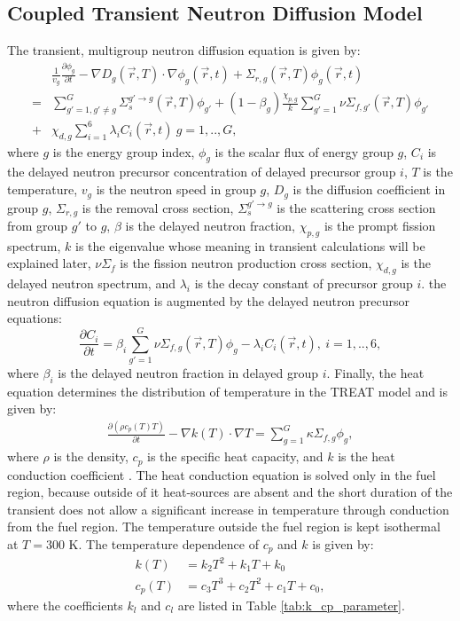 \documentclass{anstrans}
\begin{document}
\subsection{Coupled Transient Neutron Diffusion Model}
The transient, multigroup neutron diffusion equation is given by:
\begin{align}\label{eq:neutron_diffusion}
   &\frac{1}{v_g} \frac{\partial \phi_g}{\partial t} -\nabla D_g(\vec{r},T) \cdot \nabla \phi_g(\vec{r}, t) + \Sigma_{r,g}(\vec{r}, T) \phi_g(\vec{r}, t) \nonumber \\
   = &\sum\limits_{g'=1, g' \neq g}^G \Sigma_s^{g' \rightarrow g} (\vec{r},T) \phi_{g'}  
   +(1 - \beta_g) \frac{\chi_{p,g}}{k}\sum\limits_{g'=1}^G \nu \Sigma_{f,g'} (\vec{r},T) \phi_{g'} \nonumber \\
+& \chi_{d,g }\sum\limits_{i=1}^6  \lambda_i C_i(\vec{r}, t)~g=1,..,G,
\end{align}
where $g$ is the energy group index, $\phi_g$ is the scalar flux of energy group $g$, $C_i$ is the delayed neutron precursor concentration of delayed precursor group $i$, $T$ is the temperature, $v_g$ is the neutron speed in group $g$, $D_g$ is the diffusion coefficient in group $g$, $\Sigma_{r,g}$ is the removal cross section, $\Sigma_s^{g'\rightarrow g}$ is the scattering cross section from group $g'$ to $g$, $\beta$ is the delayed neutron fraction, $\chi_{p,g}$ is the prompt fission spectrum, $k$ is the eigenvalue whose meaning in transient calculations will be explained later, $\nu \Sigma_f$  is the fission neutron production cross section, $\chi_{d,g}$ is the delayed neutron spectrum, and $\lambda_i$ is the decay constant of precursor group $i$. the neutron diffusion equation  is augmented by the delayed neutron precursor equations:
\begin{equation}\label{eq:delayed_precursors}
   \frac{\partial C_i }{\partial t} = \beta_i \sum\limits_{g'=1}^G \nu \Sigma_{f,g} (\vec{r},T) \phi_{g} - \lambda_i C_i(\vec{r},t),~i=1,..,6,
\end{equation} 
where $\beta_i$ is the delayed neutron fraction in delayed group $i$. Finally, the heat equation determines the distribution of temperature in the TREAT model and is given by:
\begin{align}\label{eq:heat_conduction}
  \frac{\partial (\rho c_p(T)T)}{\partial t} - \nabla k(T) \cdot \nabla T =\sum\limits_{g=1}^G \kappa \Sigma_{f,g} \phi_g,
\end{align}
where $\rho$ is the density, $c_p$ is the specific heat capacity, and $k$ is the heat conduction coefficient . The heat conduction equation is solved only in the fuel region, because outside of it heat-sources are absent and the short duration of the transient does not allow a significant increase in temperature through conduction from the fuel region. The temperature outside the fuel region is kept isothermal at $T=300$ K. The temperature dependence of $c_p$ and $k$ is given by:
\begin{align}\label{eq:heat_conduction_empirical}
 k (T)&=  k_2T^2+k_1  T +k_0 \nonumber \\
  c_p(T) &= c_3 T^3 + c_2 T^2 + c_1 T + c_0,
\end{align}
where the coefficients $k_l$ and $c_l$ are listed in Table \ref{tab:k_cp_parameter}.
\end{document}
